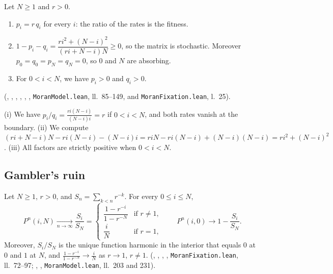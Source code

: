 \begin{lemma}\label{ch4:lem:moranbase}
Let $N\ge1$ and $r>0$.
\begin{enumerate}[label=(\roman*),itemsep=1pt]
\item $p_i=r\,q_i$ for every $i$: the ratio of the rates is the fitness.
\item $1-p_i-q_i=\dfrac{ri^2+(N-i)^2}{(ri+N-i)N}\ge0$, so the matrix is stochastic. Moreover
$p_0=q_0=p_N=q_N=0$, so $0$ and $N$ are absorbing.
\item For $0<i<N$, we have $p_i>0$ and $q_i>0$.
\end{enumerate}
\tierA{} (, , , ,
, , \texttt{MoranModel.lean}, ll.~85--149, and
\texttt{MoranFixation.lean}, l.~25).
\end{lemma}

\begin{humanproof}
(i) We have $p_i/q_i=\frac{ri(N-i)}{(N-i)i}=r$ if $0<i<N$, and both rates vanish at the boundary.
(ii) We compute
$(ri+N-i)N-ri(N-i)-(N-i)i=riN-ri(N-i)+(N-i)(N-i)=ri^2+(N-i)^2$.
(iii) All factors are strictly positive when $0<i<N$.
\end{humanproof}

\subsection{Gambler's ruin}

\begin{theorem}\label{ch4:thm:moran}
Let $N\ge1$, $r>0$, and $S_n=\sum_{k<n}r^{-k}$. For every $0\le i\le N$,
\[
P^n(i,N)\xrightarrow[n\to\infty]{}\frac{S_i}{S_N}=
\begin{cases}\dfrac{1-r^{-i}}{1-r^{-N}}&\text{if }r\ne1,\\[2mm] \dfrac iN&\text{if }r=1,\end{cases}
\qquad P^n(i,0)\longrightarrow1-\frac{S_i}{S_N}.
\]
Moreover, $S_i/S_N$ is the unique function harmonic in the interior that equals $0$ at $0$ and $1$ at $N$, and
$\frac{1-r^{-i}}{1-r^{-N}}\to\frac iN$ as $r\to1$, $r\ne1$. \tierA{} (,
, , ,
\texttt{MoranFixation.lean}, ll.~72--97; , ,
\texttt{MoranModel.lean}, ll.~203 and 231).
\end{theorem}

